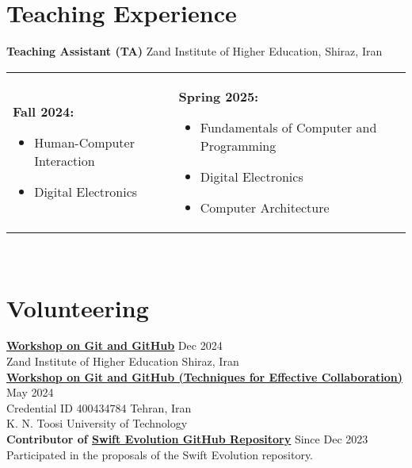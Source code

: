 \documentclass[letter,10pt]{article}
\newcommand{\customsquare}{\raisebox{0.25ex}{\scalebox{0.45}{$\blacksquare$}}}
\begin{document}
\section*{Teaching Experience}
\textbf{Teaching Assistant (TA)} \hfill Zand Institute of Higher Education, Shiraz, Iran \\ [5pt]
\begin{tabularx}{\textwidth}{@{}X X@{}}
    \customsquare\hspace{2mm}\textbf{Fall 2024:} 
    \begin{itemize}
        \item Human-Computer Interaction
        \item Digital Electronics
    \end{itemize}
    &
    \customsquare\hspace{2mm}\textbf{Spring 2025:} 
    \begin{itemize}
        \item Fundamentals of Computer and Programming
        \item Digital Electronics
        \item Computer Architecture
    \end{itemize}
\end{tabularx} \\ [-20pt]

\section*{Volunteering}
\href{https://github.com/karami-mehdi/CV/blob/main/Assets/certificate-of-workshop-participation-karami-mehdi-zand-ihe.pdf}{\underline{\textbf{Workshop on Git and GitHub}}} \hfill Dec 2024 \\ [2pt]
Zand Institute of Higher Education \hfill Shiraz, Iran \\ [5pt]
\href{https://github.com/karami-mehdi/CV/blob/main/Assets/certificate-of-workshop-participation-karami-mehdi.pdf}{\underline{\textbf{Workshop on Git and GitHub (Techniques for Effective Collaboration)}}} \hfill May 2024 \\ [2pt]
Credential ID 400434784 \hfill Tehran, Iran \\ 
K. N. Toosi University of Technology \\ [5pt]
\textbf{Contributor of \href{https://github.com/swiftlang/swift-evolution}{\underline{\textbf{Swift Evolution GitHub Repository}}}} \hfill Since Dec 2023 \\ [2pt]
Participated in the proposals of the Swift Evolution repository.
\end{document}
